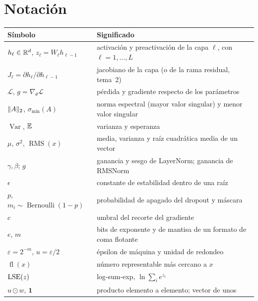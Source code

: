 \documentclass[11pt,a4paper,twoside,openany]{book}
\newcommand{\uno}{\mathbf{1}}
\newcommand{\Var}{\operatorname{Var}}
\newcommand{\RMS}{\operatorname{RMS}}
\newcommand{\Bern}{\operatorname{Bernoulli}}
\newcommand{\fl}{\operatorname{fl}}
\newcommand{\smin}{\sigma_{\min}}
\newcommand{\Loss}{\mathcal{L}}
\begin{document}
\section*{Notación}
\begin{center}
\begin{tabular}{@{}ll@{}}
\toprule
Símbolo & Significado \\
\midrule
$h_\ell\in\mathbb{R}^{d}$, $z_\ell=W_\ell h_{\ell-1}$ & activación y preactivación de la capa $\ell$, con $\ell=1,\dots,L$ \\
$J_\ell=\partial h_\ell/\partial h_{\ell-1}$ & jacobiano de la capa (o de la rama residual, tema~2) \\
$\Loss$, $g=\nabla_\theta\Loss$ & pérdida y gradiente respecto de los parámetros \\
$\lVert A\rVert_2$, $\smin(A)$ & norma espectral (mayor valor singular) y menor valor singular \\
$\Var$, $\mathbb{E}$ & varianza y esperanza \\
$\mu$, $\sigma^{2}$, $\RMS(x)$ & media, varianza y raíz cuadrática media de un vector \\
$\gamma,\beta$; $g$ & ganancia y sesgo de LayerNorm; ganancia de RMSNorm \\
$\epsilon$ & constante de estabilidad dentro de una raíz \\
$p$, $m_i\sim\Bern(1-p)$ & probabilidad de apagado del dropout y máscara \\
$c$ & umbral del recorte del gradiente \\
$e$, $m$ & bits de exponente y de mantisa de un formato de coma flotante \\
$\varepsilon=2^{-m}$, $u=\varepsilon/2$ & épsilon de máquina y unidad de redondeo \\
$\fl(x)$ & número representable más cercano a $x$ \\
$\operatorname{LSE}(z)$ & log-sum-exp, $\ln\sum_i e^{z_i}$ \\
$u\odot w$, $\uno$ & producto elemento a elemento; vector de unos \\
\bottomrule
\end{tabular}
\end{center}

\tableofcontents

\mainmatter







\appendix


\backmatter

\end{document}

